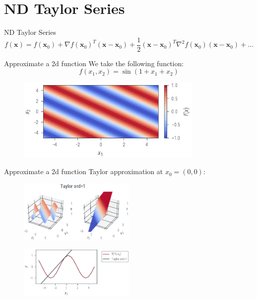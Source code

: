 \documentclass{beamer}
\begin{document}
\section{ND Taylor Series}

\begin{frame}{ND Taylor Series}
    \begin{equation*}
        f(\boldsymbol{x}) = f(\boldsymbol{x}_0) + \nabla f(\boldsymbol{x}_0)^T(\boldsymbol{x}-\boldsymbol{x}_0) + \frac{1}{2}(\boldsymbol{x}-\boldsymbol{x}_0)^T \nabla^2 f(\boldsymbol{x}_0)(\boldsymbol{x}-\boldsymbol{x}_0) + \dots
    \end{equation*}
\end{frame}

\begin{frame}{Approximate a 2d function}
    We take the following function:
    \begin{equation*}
        f(x_1, x_2) = \sin(1 + x_1 + x_2)
    \end{equation*}

    \begin{figure}
        \includegraphics[width=0.8\textwidth]{../figures/laplace-approx/sin2d.pdf}
    \end{figure}

\end{frame}

\begin{frame}{Approximate a 2d function}
    Taylor approximation at $x_0 = (0, 0)$:
    \begin{figure}
        \includegraphics[width=0.5\textwidth]{../figures/laplace-approx/sin2d-taylor-1.pdf}
    \end{figure}
    \begin{figure}
        \includegraphics[width=0.5\textwidth]{../figures/laplace-approx/sin2d-taylor-1d-1.pdf}
    \end{figure}

\end{frame}
\end{document}
